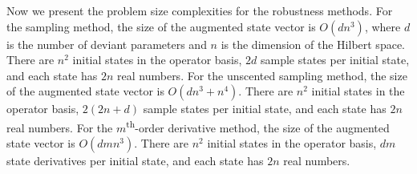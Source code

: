 Now we present the problem size complexities for the robustness methods.
For the sampling method, the size of the augmented state vector
is $O(dn^{3})$, where $d$ is the number of deviant parameters and
$n$ is the dimension of the Hilbert space. There are $n^{2}$ initial states
in the operator basis, $2d$ sample states per initial state,
and each state has $2n$ real numbers.
For the unscented sampling method, the size of the augmented state vector
is $O(dn^{3} + n^{4})$.
There are $n^{2}$ initial states in the operator basis,
$2(2n + d)$ sample states per initial state,
and each state has $2n$ real numbers.
For the $m$\textsuperscript{th}-order derivative method, the size of the augmented state vector
is $O(dmn^{3})$. There are $n^{2}$
initial states in the operator basis, $dm$ state derivatives per initial state,
and each state has $2n$ real numbers.
